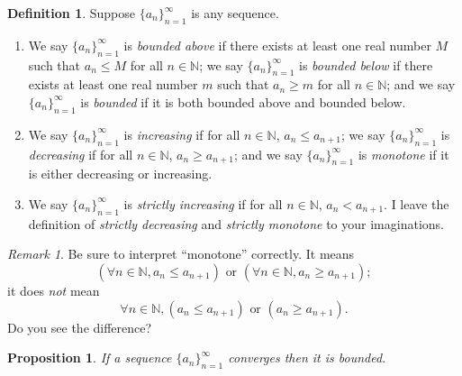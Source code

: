 \documentclass[12pt]{amsart}
\newcommand{\N}{\mathbb{N}}
\numberwithin{equation}{section}
\theoremstyle{plain} %
\newtheorem{prop}[equation]{Proposition}
\theoremstyle{definition}
\newtheorem{defn}[equation]{Definition}
\theoremstyle{remark}
\newtheorem{rem}[equation]{Remark}
\begin{document}
\begin{defn} Suppose $\{a_n\}_{n=1}^\infty$ is any sequence. 

\begin{enumerate}

\item 
We say $\{a_n\}_{n=1}^\infty$ is {\em bounded above} if there  exists at least one real number $M$ such that $a_n \leq M$ for all $n   \in
\N$; 
we say $\{a_n\}_{n=1}^\infty$ is {\em bounded below} if there  exists at least one real number $m$ such that $a_n \geq m$ for all $n   \in
\N$; and we say 
$\{a_n\}_{n=1}^\infty$ is {\em bounded} if it is both bounded above and bounded below.

\item We say $\{a_n\}_{n=1}^\infty$ is {\em increasing} if for all $n \in \N$, $a_n \leq a_{n+1}$;
we say $\{a_n\}_{n=1}^\infty$ is {\em decreasing} if for all $n \in \N$, $a_n \geq a_{n+1}$; and we say
$\{a_n\}_{n=1}^\infty$ is {\em monotone} if it is either decreasing or increasing.

\item We say $\{a_n\}_{n=1}^\infty$ is {\em strictly increasing} if for all $n \in \N$, $a_n < a_{n+1}$. I leave the definition of
{\em strictly decreasing} and {\em strictly monotone} to your imaginations.
\end{enumerate}
\end{defn}


\begin{rem} Be sure to interpret ``monotone'' correctly. It means
$$
\left(\forall n \in \N, a_n \leq a_{n+1}\right) \text{ or }
\left(\forall n \in \N, a_n \geq a_{n+1}\right);
$$
it does {\em not} mean
$$
\forall n \in \N, \left( a_n \leq a_{n+1}\right) \text{ or } \left(a_n \geq a_{n+1}\right).
$$
Do you see the difference?
\end{rem}




\begin{prop} \label{prop21}
	If a sequence $\{a_n\}_{n=1}^\infty$ converges then it is bounded.
\end{prop}
\end{document}
